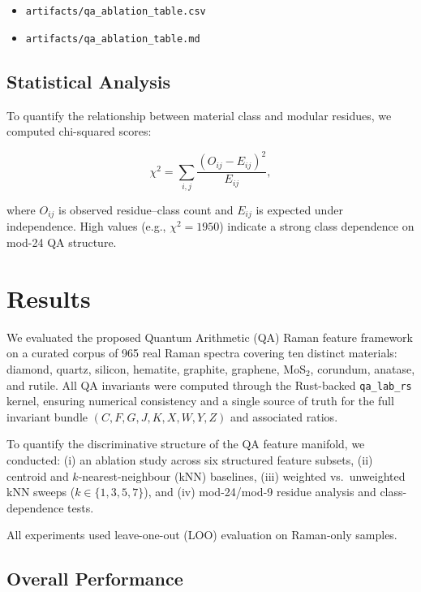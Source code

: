 \documentclass[12pt]{article}
\begin{document}
\begin{itemize}
    \item \texttt{artifacts/qa\_ablation\_table.csv}
    \item \texttt{artifacts/qa\_ablation\_table.md}
\end{itemize}

\subsection{Statistical Analysis}

To quantify the relationship between material class and modular residues, we computed chi-squared scores:

\[
\chi^2 = \sum_{i,j}
\frac{\left( O_{ij} - E_{ij} \right)^2}{E_{ij}},
\]

where $O_{ij}$ is observed residue–class count and $E_{ij}$ is expected under independence.  
High values (e.g., $\chi^2 = 1950$) indicate a strong class dependence on mod-24 QA structure.

\section{Results}
\label{sec:results}

We evaluated the proposed Quantum Arithmetic (QA) Raman feature framework on a curated corpus of 
965 real Raman spectra covering ten distinct materials:
diamond, quartz, silicon, hematite, graphite, graphene, MoS$_2$, corundum, anatase, and rutile.
All QA invariants were computed through the Rust-backed \texttt{qa\_lab\_rs} kernel, ensuring
numerical consistency and a single source of truth for the full invariant bundle
$(C, F, G, J, K, X, W, Y, Z)$ and associated ratios.

To quantify the discriminative structure of the QA feature manifold, we conducted:
(i) an ablation study across six structured feature subsets,
(ii) centroid and $k$-nearest-neighbour (kNN) baselines,
(iii) weighted vs.\ unweighted kNN sweeps ($k\in\{1,3,5,7\}$),
and (iv) mod-24/mod-9 residue analysis and class-dependence tests.

All experiments used leave-one-out (LOO) evaluation on Raman-only samples.

\subsection{Overall Performance}
\end{document}
